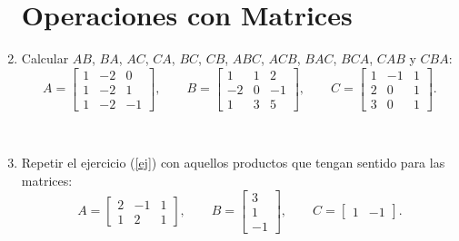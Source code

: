 \documentclass[11pt,spanish,makeidx]{amsbook}
\begin{document}
\begin{enumerate}
\section*{Operaciones con Matrices}

\vspace{.5cm}

\item\label{ej} Calcular  $AB$, $BA$, $AC$, $CA$, $BC$, $CB$,
$ABC$, $ACB$, $BAC$, $BCA$, $CAB$ y $CBA$:
$$
A= \begin{bmatrix} 1&-2&0\\ 1&-2&1\\ 1&-2&-1\end{bmatrix},\quad
\quad B= \begin{bmatrix}1&1&2\\ -2&0&-1\\ 1&3&5 \end{bmatrix},
\quad\quad C=\begin{bmatrix}1&-1&1\\ 2&0&1\\ 3&0&1 \end{bmatrix}.
$$

%

%

\

 \item  Repetir el ejercicio (\ref{ej}) con aquellos productos que tengan sentido para las matrices: 
 \begin{equation*}
 	A=\begin{bmatrix} 2 & -1 & 1 \\ 1 & 2 &
 	1\end{bmatrix},\qquad
 	B=\begin{bmatrix} 3 \\ 1 \\ -1\end{bmatrix}, \qquad
 	C=\begin{bmatrix} 1 & -1 \end{bmatrix}.
 \end{equation*}





\end{enumerate}
\end{document}
